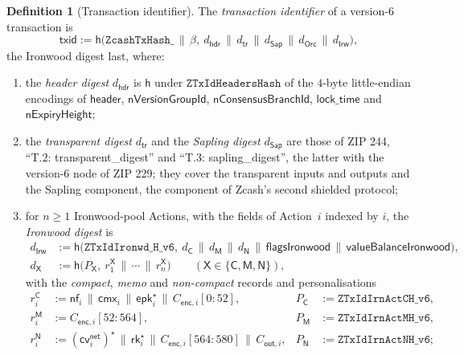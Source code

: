 \documentclass[11pt,a4paper]{article}
\theoremstyle{definition}
\newtheorem{definition}[theorem]{Definition}
\newcommand{\nfsym}{\mathsf{nf}}
\newcommand{\cmx}{\mathsf{cmx}}
\newcommand{\cvsym}{\mathsf{cv}}
\newcommand{\rk}{\mathsf{rk}}
\begin{document}
\begin{definition}[Transaction identifier]
The \emph{transaction identifier} of a version-$6$ transaction is
\[
  \mathsf{txid} := \mathsf{h}\bigl(\texttt{ZcashTxHash\_} \,\|\, \beta,\
    d_{\mathsf{hdr}} \,\|\, d_{\mathsf{tr}} \,\|\, d_{\mathsf{Sap}}
    \,\|\, d_{\mathsf{Orc}} \,\|\, d_{\mathsf{Irw}}\bigr),
\]
the Ironwood digest last, where:
\begin{enumerate}[label=(\roman*)]
\item the \emph{header digest} $d_{\mathsf{hdr}}$ is $\mathsf{h}$ under
  $\texttt{ZTxIdHeadersHash}$ of the $4$-byte little-endian encodings of
  $\mathsf{header}$, $\mathsf{nVersionGroupId}$,
  $\mathsf{nConsensusBranchId}$, $\mathsf{lock\_time}$ and
  $\mathsf{nExpiryHeight}$;
\item the \emph{transparent digest} $d_{\mathsf{tr}}$ and the \emph{Sapling
  digest} $d_{\mathsf{Sap}}$ are those of ZIP 244, ``T.2:
  transparent\_digest'' and ``T.3: sapling\_digest'', the latter with the
  version-$6$ node of ZIP 229; they cover the transparent inputs and
  outputs and the Sapling component, the component of Zcash's second
  shielded protocol;
\item for $n \ge 1$ Ironwood-pool Actions, with the fields of Action~$i$
  indexed by $i$, the \emph{Ironwood digest} is
  \begin{align*}
    d_{\mathsf{Irw}} &:= \mathsf{h}\bigl(\texttt{ZTxIdIronwd\_H\_v6},\
      d_{\mathsf{C}} \,\|\, d_{\mathsf{M}} \,\|\, d_{\mathsf{N}} \,\|\,
      \mathsf{flagsIronwood} \,\|\, \mathsf{valueBalanceIronwood}\bigr),
      \\
    d_{\mathsf{X}} &:= \mathsf{h}\bigl(P_{\mathsf{X}},\
      r^{\mathsf{X}}_1 \,\|\, \cdots \,\|\, r^{\mathsf{X}}_n\bigr)
      \qquad (\mathsf{X} \in \{\mathsf{C}, \mathsf{M}, \mathsf{N}\}),
  \end{align*}
  with the \emph{compact}, \emph{memo} and \emph{non-compact} records and
  personalisations
  \begin{align*}
    r^{\mathsf{C}}_i &:= \nfsym_i \,\|\, \cmx_i \,\|\,
      \mathsf{epk}_i^{\star} \,\|\, C_{\mathsf{enc},i}[0{:}52], &
    P_{\mathsf{C}} &:= \texttt{ZTxIdIrnActCH\_v6}, \\
    r^{\mathsf{M}}_i &:= C_{\mathsf{enc},i}[52{:}564], &
    P_{\mathsf{M}} &:= \texttt{ZTxIdIrnActMH\_v6}, \\
    r^{\mathsf{N}}_i &:= (\cvsym^{\mathsf{net}}_i)^{\star} \,\|\,
      \rk_i^{\star} \,\|\, C_{\mathsf{enc},i}[564{:}580] \,\|\,
      C_{\mathsf{out},i}, &
    P_{\mathsf{N}} &:= \texttt{ZTxIdIrnActNH\_v6};

\end{align*}
\end{enumerate}
\end{definition}
\end{document}
